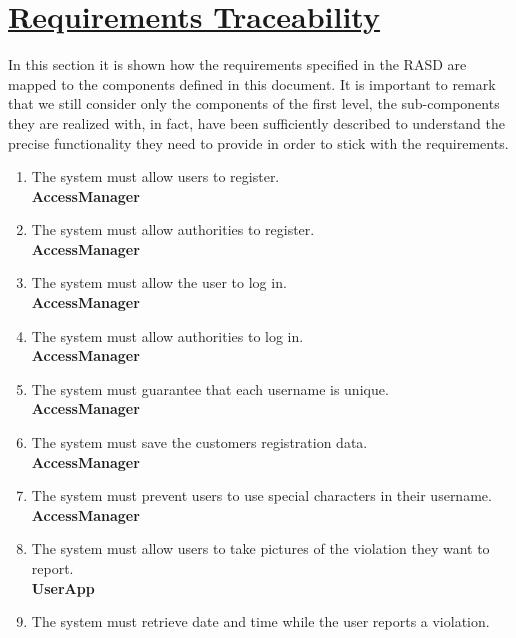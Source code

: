 \section[Requirements Traceability]{\hyperlink{toc}{Requirements Traceability}}
	\label{sec:requirementsTraceability}
	
	In this section it is shown how the requirements specified in the RASD \cite{RASD} are mapped
	to the components defined in this document. It is important to remark that we still consider only the components of the first level, the sub-components they are realized with, in fact, have been sufficiently described to understand the precise functionality they need to provide in order to stick with the requirements.
	
	\begin{enumerate}[label=\textbf{R\arabic*}]
		\item \label{req:userReg} The system must allow users to register.\\
		\textbf{AccessManager}
		\item \label{req:authorityReg} The system must allow authorities to register.\\
		\textbf{AccessManager}
		\item \label{req:userLogin} The system must allow the user to log in.\\
		\textbf{AccessManager}
		\item \label{req:authorityLogin} The system must allow authorities to log in.\\
		\textbf{AccessManager}
		\item \label{req:uniqueName} The system must guarantee that each username is unique.\\
		\textbf{AccessManager}
		\item \label{req:saveRegData} The system must save the customers registration data.\\
		\textbf{AccessManager}
		\item \label{req:specialCharacters} The system must prevent users to use special characters in their username.\\
		\textbf{AccessManager}
		\item \label{req:takePictures} The system must allow users to take pictures of the violation they want to report.\\
		\textbf{UserApp}
		\item \label{req:dateTime} The system must retrieve date and time while the user reports a violation.\\

\end{enumerate}
